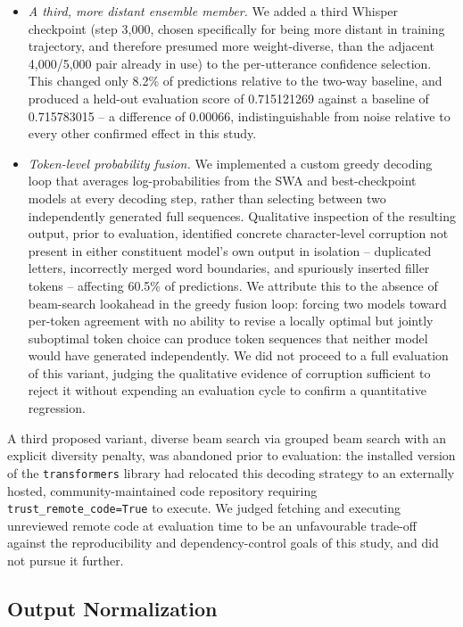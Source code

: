 \documentclass[11pt]{article}
\begin{document}
\begin{itemize}
\item \textit{A third, more distant ensemble member.} We added a third Whisper checkpoint (step 3{,}000, chosen specifically for being more distant in training trajectory, and therefore presumed more weight-diverse, than the adjacent 4{,}000/5{,}000 pair already in use) to the per-utterance confidence selection. This changed only 8.2\% of predictions relative to the two-way baseline, and produced a held-out evaluation score of 0.715121269 against a baseline of 0.715783015 -- a difference of 0.00066, indistinguishable from noise relative to every other confirmed effect in this study.
\item \textit{Token-level probability fusion.} We implemented a custom greedy decoding loop that averages log-probabilities from the SWA and best-checkpoint models at every decoding step, rather than selecting between two independently generated full sequences. Qualitative inspection of the resulting output, prior to evaluation, identified concrete character-level corruption not present in either constituent model's own output in isolation -- duplicated letters, incorrectly merged word boundaries, and spuriously inserted filler tokens -- affecting 60.5\% of predictions. We attribute this to the absence of beam-search lookahead in the greedy fusion loop: forcing two models toward per-token agreement with no ability to revise a locally optimal but jointly suboptimal token choice can produce token sequences that neither model would have generated independently. We did not proceed to a full evaluation of this variant, judging the qualitative evidence of corruption sufficient to reject it without expending an evaluation cycle to confirm a quantitative regression.
\end{itemize}

A third proposed variant, diverse beam search via grouped beam search with an explicit diversity penalty, was abandoned prior to evaluation: the installed version of the \texttt{transformers} library had relocated this decoding strategy to an externally hosted, community-maintained code repository requiring \texttt{trust\_remote\_code=True} to execute. We judged fetching and executing unreviewed remote code at evaluation time to be an unfavourable trade-off against the reproducibility and dependency-control goals of this study, and did not pursue it further.

\subsection{Output Normalization}
\label{sec:normalization}
\end{document}
